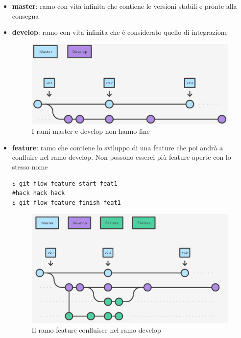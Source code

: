 \begin{itemize}
    \item \textbf{master}: ramo con vita infinita che contiene le versioni stabili e pronte alla consegna
    \item \textbf{develop}: ramo con vita infinita che è considerato quello di integrazione
    \begin{figure}[H]
    	\begin{center}
        	 \includegraphics[scale=0.55]{img/master-develop.png}
        	 \caption{I rami master e develop non hanno fine}
        \end{center}
    \end{figure}
    \item \textbf{feature}: ramo che contiene lo sviluppo di una feature che poi andrà a confluire nel ramo develop. Non possono esserci più feature aperte con lo stesso nome
    \begin{verbatim}
$ git flow feature start feat1
#hack hack hack 
$ git flow feature finish feat1
    \end{verbatim}
    \begin{figure}[H]
    	\begin{center}
        	 \includegraphics[scale=0.55]{img/feature.png}
        	 \caption{Il ramo feature confluisce nel ramo develop}
     	\end{center}
    \end{figure}
    

\end{itemize}
